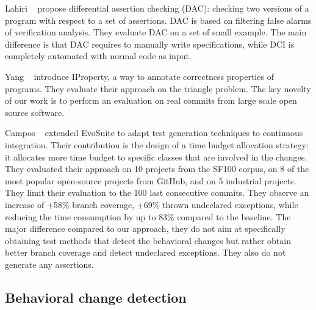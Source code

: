 Lahiri \etal~\cite{differential-assertion-checking} propose differential assertion checking (DAC): checking two versions of a program with respect to a set of assertions. DAC is based on filtering false alarms of verification analysis. They evaluate DAC on a set of small example.
The main difference is that DAC requires to manually write specifications, while DCI is completely automated with normal code as input.

Yang \etal~\cite{Yang:2014:PDI:2568225.2568319} introduce IProperty, a  way to annotate  correctness properties of programs. They evaluate their approach on the triangle problem.
The key novelty of our work is to perform an evaluation on real commits from large scale open source software.

Campos \etal~\cite{Campos:2014:CTG:2642937.2643002} extended EvoSuite to adapt test generation techniques to continuous integration.
Their contribution is the design of a time budget allocation strategy: it allocates more time budget to specific classes that are involved in the changes.
They evaluated their approach on 10 projects from the SF100 corpus, on 8 of the most popular open-source projects from GitHub, and on 5 industrial projects.
They limit their evaluation to the 100 last consecutive commits.
They observe an increase of +58\% branch coverage, +69\% thrown undeclared exceptions, while reducing the time consumption by up to 83\% compared to the baseline.
The major difference compared to our approach, they do not aim at specifically obtaining test methods that detect the behavioral changes but rather obtain better branch coverage and detect undeclared exceptions. They also do not generate any assertions.


\subsection{Behavioral change detection}


